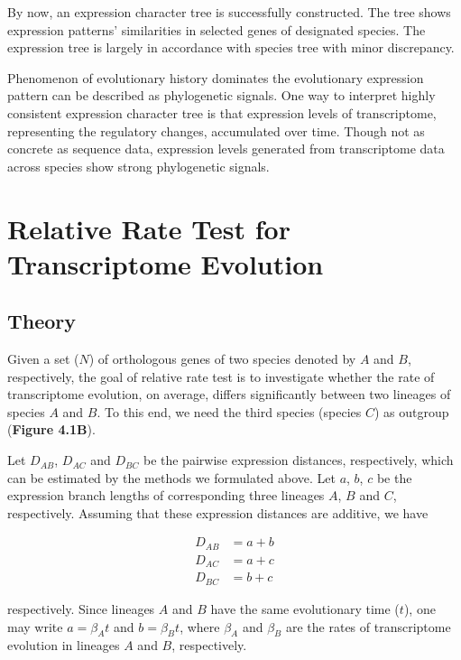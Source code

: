 \documentclass[]{book}
\begin{document}
By now, an expression character tree is successfully constructed. The tree shows expression patterns' similarities in selected genes of designated species. The expression tree is largely in accordance with species tree with minor discrepancy.

Phenomenon of evolutionary history dominates the evolutionary expression pattern can be described as phylogenetic signals. One way to interpret highly consistent expression character tree is that expression levels of transcriptome, representing the regulatory changes, accumulated over time. Though not as concrete as sequence data, expression levels generated from transcriptome data across species show strong phylogenetic signals.

\hypertarget{relative-rate-test-for-transcriptome-evolution}{%
\chapter{Relative Rate Test for Transcriptome Evolution}\label{relative-rate-test-for-transcriptome-evolution}}

\hypertarget{theory-1}{%
\section{Theory}\label{theory-1}}

Given a set (\(N\)) of orthologous genes of two species denoted by \(A\) and \(B\), respectively, the goal of relative rate test is to investigate whether the rate of transcriptome evolution, on average, differs significantly between two lineages of species \(A\) and \(B\). To this end, we need the third species (species \(C\)) as outgroup (\textbf{Figure 4.1B}).

Let \(D_{AB}\), \(D_{AC}\) and \(D_{BC}\) be the pairwise expression distances, respectively, which can be estimated by the methods we formulated above. Let \(a\), \(b\), \(c\) be the expression branch lengths of corresponding three lineages \(A\), \(B\) and \(C\), respectively. Assuming that these expression distances are additive, we have

\[
\begin{split}
D_{AB}&=a+b \\
D_{AC}&=a+c \\
D_{BC}&=b+c
\end{split}\tag{2.1}
\]

respectively. Since lineages \(A\) and \(B\) have the same evolutionary time (\(t\)), one may write \(a=\beta_At\) and \(b=\beta_Bt\), where \(\beta_A\) and \(\beta_B\) are the rates of transcriptome evolution in lineages \(A\) and \(B\), respectively.
\end{document}
